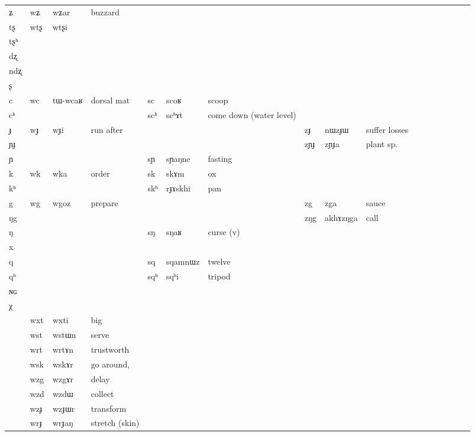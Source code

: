 \documentclass[oldfontcommands,oneside,a4paper,11pt]{article}
\newcommand{\ipa}[1]{{\phon #1}} %
\newcommand{\tib}[1]{\cellcolor{lightgray}\textbf{#1}}
\begin{document}
\begin{table}
{\begin{tabular}{l|lll|lll|lll|lllllll}
\ipa{ʑ}  &	\ipa{wʑ}  &	\ipa{wʑar }  &	buzzard&	  &	  &	&	  &	  &	&	\\
\ipa{tʂ}  &	\ipa{wtʂ}  &	\ipa{wtʂi}  & 	&	  &	  &	&	  &	  &	&	\\
\ipa{tʂʰ}  &	  &	  &	&	  &	  &	&	  &	  &	&	\\
\ipa{dʐ}  &	  &	  &	&	  &	  &	&	  &	  &	&	\\
\ipa{ndʐ}  &	  &	  &	&	  &	  &	&	  &	  &	&	\\
\ipa{ʂ}  &	  &	  &	&	  &	  &	&	  &	  &	&	\\
\ipa{c}  &	\ipa{wc}  &	\ipa{tɯ-wcaʁ }  &dorsal mat	&	\ipa{sc}  &	\ipa{scoʁ}  &scoop	&	  &	  &	&	\\
\ipa{cʰ}  &	  &	  &	&	\ipa{scʰ}  &	\ipa{scʰɤt}  &	come down (water level)&	  &	  &	&	\\
\ipa{ɟ}  &	\ipa{wɟ}  &	\ipa{wɟi}  &run after	&	  &	  &	&	\ipa{zɟ}  &	\ipa{nɯzɟɯ}  &	suffer losses&	\\
\ipa{ɲɟ}  &	  &	  &	&	  &	  &	&	\ipa{zɲɟ}  &	\ipa{zɲɟa}  &	plant sp.&	\\
\ipa{ɲ}  &	  &	  &	&	\ipa{sɲ}  &	\ipa{sɲaŋne}  &fasting	&	   &	 &	&	\\
\ipa{k}  &	\ipa{wk}  &	\ipa{wka}  &	order&	\ipa{sk}  &	\ipa{skɤm}  &	ox&	  &	  &	&	\\
\ipa{kʰ}  &	  &	  &	&	\ipa{skʰ}  &	\ipa{rɟɤskhi}  &pan	&	  &	  &	&	\\
\ipa{g}  &	\ipa{wg}  \tib{}&	\ipa{wgoz}  &	prepare&	  &	  &	& 	\ipa{zg}  &	\ipa{zga}  &	sauce&	\\
\ipa{ŋg}  &	  &	  &	&	  &	  &	&	\ipa{zŋg}  &	\ipa{akhɤzŋga}  &	call&	\\
\ipa{ŋ}  &	  &	  &	&	\ipa{sŋ}  &	\ipa{sŋaʁ}  &	curse (v)&	  &	  &	&	\\
\ipa{x}  &	  &	  &	&	  &	  &	&	  &	  &	&	\\
\ipa{q}  &	  &	  &	&	\ipa{sq}  &	\ipa{sqamnɯz}  &	twelve&	  &	  &	&	\\
\ipa{qʰ}  &	  &	  &	&	\ipa{sqʰ}  &	\ipa{sqʰi}  &	tripod&	  &	  &	&	\\
\ipa{ɴɢ}  &	  &	  &	&	  &	  &	&	  &	  &	&	\\
\ipa{χ}  &	  &	  &	&	  &	  &	&	  &	  &	&	\\
\midrule
&	\ipa{wxt}  &	\ipa{wxti}  &big	\\
&	\ipa{wst} \tib{} &	\ipa{wstɯn}  &serve	\\
&	\ipa{wrt}  \tib{} &	\ipa{wrtɤn}  &	trustworth\\
&	\ipa{wsk}  \tib{} &	\ipa{wskɤr}  & go around, 	\\
&	\ipa{wzg}  \tib{} &	\ipa{wzgɤr}  & delay	\\
&	\ipa{wzd}  \tib{} &	\ipa{wzdɯ}  & collect	\\
&	\ipa{wzɟ}  \tib{} &	\ipa{wzɟɯr}  & transform	\\
&	\ipa{wrɟ}  \tib{} &	\ipa{wrɟaŋ}  &stretch (skin)	\\
\bottomrule
\end{tabular}}
\end{table}
 
\end{document}
